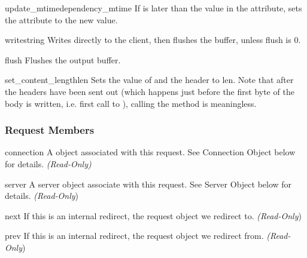 \begin{methoddesc}[request]{update_mtime}{dependency_mtime}
  If  is later than the value in the 
  attribute, sets the attribute to the new value.
\end{methoddesc}

\begin{methoddesc}[request]{write}{string}
  Writes  directly to the client, then flushes the buffer,
  unless flush is 0.
\end{methoddesc}

\begin{methoddesc}[request]{flush}{}
  Flushes the output buffer.
\end{methoddesc}

\begin{methoddesc}[request]{set_content_length}{len}
  Sets the value of  and the 
  header to len. Note that after the headers have been sent out (which
  happens just before the first byte of the body is written,
  i.e. first call to ), calling the method is
  meaningless.
\end{methoddesc}


\subsubsection{Request Members\label{pyapi-mprequest-mem}}

\begin{memberdesc}[request]{connection}
  A  object associated with this request. See
  Connection Object below for details.
  \emph{(Read-Only)}
\end{memberdesc}

\begin{memberdesc}[request]{server}
  A server object associate with this request. See Server Object below
  for details.
  \emph{(Read-Only})
\end{memberdesc}

\begin{memberdesc}[request]{next}
  If this is an internal redirect, the request object we redirect to. 
  \emph{(Read-Only})
\end{memberdesc}

\begin{memberdesc}[request]{prev}
  If this is an internal redirect, the request object we redirect from.
  \emph{(Read-Only})
\end{memberdesc}

